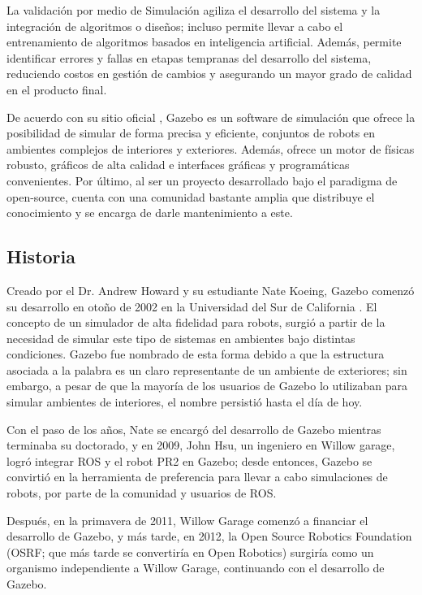 La validación por medio de Simulación agiliza el desarrollo del sistema y la integración de algoritmos o diseños;  incluso permite llevar a cabo el entrenamiento de algoritmos basados en inteligencia artificial. Además, permite identificar errores y fallas en etapas tempranas del desarrollo del sistema, reduciendo costos en gestión de cambios y asegurando un mayor grado de calidad en el producto final.

De acuerdo con su sitio oficial \cite{gazebo_2014}, Gazebo es un software de simulación que ofrece la posibilidad de simular de forma precisa y eficiente, conjuntos de robots en ambientes complejos de interiores y exteriores. Además, ofrece un motor de físicas robusto, gráficos de alta calidad e interfaces gráficas y programáticas convenientes. Por último, al ser un proyecto desarrollado bajo el paradigma de open-source, cuenta con una comunidad bastante amplia que distribuye el conocimiento y se encarga de darle mantenimiento a este.

\subsection{Historia}
Creado por el Dr. Andrew Howard y su estudiante Nate Koeing, Gazebo comenzó su desarrollo en otoño de 2002 en la Universidad del Sur de California \cite{gazebo_2014}. El concepto de un simulador de alta fidelidad para robots, surgió a partir de la necesidad de simular este tipo de sistemas en ambientes bajo distintas condiciones. Gazebo fue nombrado de esta forma debido a que la estructura asociada a la palabra es un claro representante de un ambiente de exteriores; sin embargo, a pesar de que la mayoría de los usuarios de Gazebo lo utilizaban para simular ambientes de interiores, el nombre persistió hasta el día de hoy.

Con el paso de los años, Nate se encargó del desarrollo de Gazebo mientras terminaba su doctorado, y en 2009, John Hsu, un ingeniero en Willow garage, logró integrar ROS y el robot PR2 en Gazebo; desde entonces, Gazebo se convirtió en la herramienta de preferencia para llevar a cabo simulaciones de robots, por parte de la comunidad y usuarios de ROS.

Después, en la primavera de 2011, Willow Garage comenzó a financiar el desarrollo de Gazebo, y más tarde, en 2012, la Open Source Robotics Foundation (OSRF; que más tarde se convertiría en Open Robotics) surgiría como un organismo independiente a Willow Garage, continuando con el desarrollo de Gazebo. 

